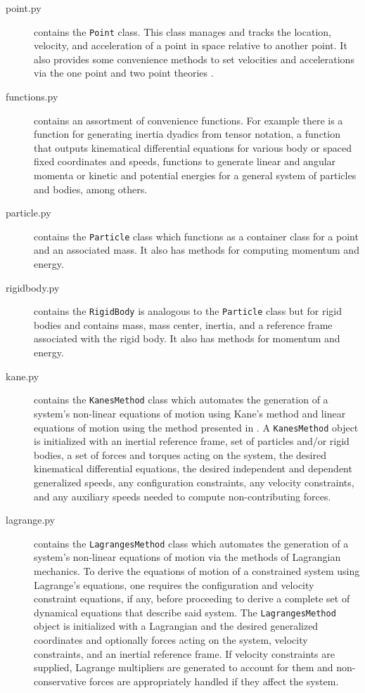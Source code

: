 \documentclass[twocolumn,10pt,final]{asme2e}
\begin{document}
\begin{description}
  \item[point.py] contains the \verb|Point| class. This class manages
    and tracks the location, velocity, and acceleration of a point in space
    relative to another point. It also provides some convenience methods to set
    velocities and accelerations via the one point and two point theories
    \cite{Kane1985}.
  \item[functions.py] contains an assortment of convenience functions. For
    example there is a function for generating inertia dyadics from tensor
    notation, a function that outputs kinematical differential equations for
    various body or spaced fixed coordinates and speeds, functions to generate
    linear and angular momenta or kinetic and potential energies for a general
    system of particles and bodies, among others.
  \item[particle.py] contains the \verb|Particle| class which functions as a
    container class for a point and an associated mass. It also has methods for
    computing momentum and energy.
  \item[rigidbody.py] contains the \verb|RigidBody| is analogous to the
    \verb|Particle| class but for rigid bodies and contains mass, mass center,
    inertia, and a reference frame associated with the rigid body. It also has
    methods for momentum and energy.
  \item[kane.py] contains the \verb|KanesMethod| class which automates the
    generation of a system's non-linear equations of motion using Kane's
    method\cite{Kane1985} and linear equations of motion using the method
    presented in \cite{Peterson2013}. A \verb|KanesMethod| object is initialized
    with an inertial reference frame, set of particles and/or rigid bodies, a
    set of forces and torques acting on the system, the desired kinematical
    differential equations, the desired independent and dependent generalized
    speeds, any configuration constraints, any velocity constraints, and any
    auxiliary speeds needed to compute non-contributing forces.
  \item[lagrange.py] contains the \verb|LagrangesMethod| class which automates
    the generation of a system's non-linear equations of motion via the methods
    of Lagrangian mechanics\cite{Crandall1968}. To derive the equations of
    motion of a constrained system using Lagrange's equations, one requires the
    configuration and velocity constraint equations, if any, before proceeding
    to derive a complete set of dynamical equations that describe said system.
    The \verb|LagrangesMethod| object is initialized with a Lagrangian and the
    desired generalized coordinates and optionally forces acting on the system,
    velocity constraints, and an inertial reference frame. If velocity
    constraints are supplied, Lagrange multipliers are generated to account for
    them and non-conservative forces are appropriately handled if they affect
    the system.
\end{description}
\end{document}
